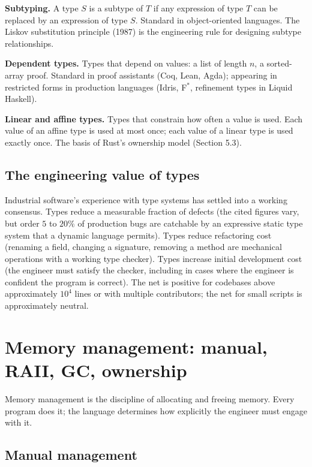 \textbf{Subtyping.} A type $S$ is a subtype of $T$ if any expression of type $T$ can be replaced by an expression of type $S$. Standard in object-oriented languages. The Liskov substitution principle (1987) is the engineering rule for designing subtype relationships.

\textbf{Dependent types.} Types that depend on values: a list of length $n$, a sorted-array proof. Standard in proof assistants (Coq, Lean, Agda); appearing in restricted forms in production languages (Idris, F$^*$, refinement types in Liquid Haskell).

\textbf{Linear and affine types.} Types that constrain how often a value is used. Each value of an affine type is used at most once; each value of a linear type is used exactly once. The basis of Rust's ownership model (Section 5.3).

\subsection{The engineering value of types}

Industrial software's experience with type systems has settled into a working consensus. Types reduce a measurable fraction of defects (the cited figures vary, but order $5$ to $20\%$ of production bugs are catchable by an expressive static type system that a dynamic language permits). Types reduce refactoring cost (renaming a field, changing a signature, removing a method are mechanical operations with a working type checker). Types increase initial development cost (the engineer must satisfy the checker, including in cases where the engineer is confident the program is correct). The net is positive for codebases above approximately $10^4$ lines or with multiple contributors; the net for small scripts is approximately neutral.

\section{Memory management: manual, RAII, GC, ownership}

Memory management is the discipline of allocating and freeing memory. Every program does it; the language determines how explicitly the engineer must engage with it.

\subsection{Manual management}

